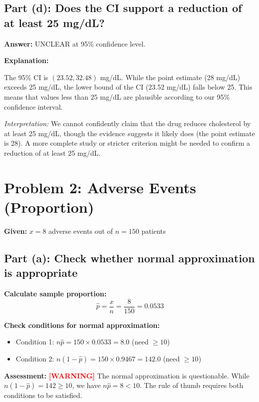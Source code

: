 \documentclass[11pt]{article}
\begin{document}
\subsection*{Part (d): Does the CI support a reduction of at least 25 mg/dL?}

\textbf{Answer:} UNCLEAR at 95\% confidence level.

\textbf{Explanation:}

The 95\% CI is $(23.52, 32.48)$ mg/dL. While the point estimate (28 mg/dL) exceeds 25 mg/dL, the lower bound of the CI (23.52 mg/dL) falls below 25. This means that values less than 25 mg/dL are plausible according to our 95\% confidence interval.

\textit{Interpretation:} We cannot confidently claim that the drug reduces cholesterol by at least 25 mg/dL, though the evidence suggests it likely does (the point estimate is 28). A more complete study or stricter criterion might be needed to confirm a reduction of at least 25 mg/dL.

\vspace{12pt}

\section*{Problem 2: Adverse Events (Proportion)}

\textbf{Given:} $x = 8$ adverse events out of $n = 150$ patients

\subsection*{Part (a): Check whether normal approximation is appropriate}

\textbf{Calculate sample proportion:}
$$\hat{p} = \frac{x}{n} = \frac{8}{150} = 0.0533$$

\textbf{Check conditions for normal approximation:}
\begin{itemize}
\item Condition 1: $n\hat{p} = 150 \times 0.0533 = 8.0$ (need $\geq 10$)
\item Condition 2: $n(1-\hat{p}) = 150 \times 0.9467 = 142.0$ (need $\geq 10$)
\end{itemize}

\textbf{Assessment:} \textcolor{red}{\textbf{[WARNING]}} The normal approximation is questionable. While $n(1-\hat{p}) = 142 \geq 10$, we have $n\hat{p} = 8 < 10$. The rule of thumb requires both conditions to be satisfied.
\end{document}
